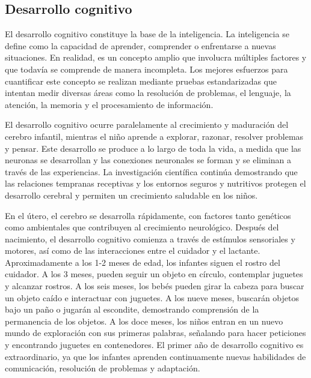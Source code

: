 \documentclass[11pt,letterpaper]{report}
\begin{document}
\subsection{Desarrollo cognitivo}
El desarrollo cognitivo constituye la base de la inteligencia. La inteligencia
se define como la capacidad de aprender, comprender o enfrentarse a nuevas
situaciones. En realidad, es un concepto amplio que involucra múltiples
factores y que todavía se comprende de manera incompleta. Los mejores esfuerzos
para cuantificar este concepto se realizan mediante pruebas estandarizadas que
intentan medir diversas áreas como la resolución de problemas, el lenguaje, la
atención, la memoria y el procesamiento de información. \cite{Wilks2010}

El desarrollo cognitivo ocurre paralelamente al crecimiento y maduración del
cerebro infantil, mientras el niño aprende a explorar, razonar, resolver
problemas y pensar. Este desarrollo se produce a lo largo de toda la vida, a
medida que las neuronas se desarrollan y las conexiones neuronales se forman y
se eliminan a través de las experiencias. La investigación científica continúa
demostrando que las relaciones tempranas receptivas y los entornos seguros y
nutritivos protegen el desarrollo cerebral y permiten un crecimiento saludable
en los niños. \cite{Crotty2023}

En el útero, el cerebro se desarrolla rápidamente, con factores tanto genéticos
como ambientales que contribuyen al crecimiento neurológico. Después del
nacimiento, el desarrollo cognitivo comienza a través de estímulos sensoriales
y motores, así como de las interacciones entre el cuidador y el lactante.
Aproximadamente a los 1-2 meses de edad, los infantes siguen el rostro del
cuidador. A los 3 meses, pueden seguir un objeto en círculo, contemplar
juguetes y alcanzar rostros. A los seis meses, los bebés pueden girar la
cabeza para buscar un objeto caído e interactuar con juguetes. A los nueve
meses, buscarán objetos bajo un paño o jugarán al escondite, demostrando
comprensión de la permanencia de los objetos. A los doce meses, los niños
entran en un nuevo mundo de exploración con sus primeras palabras, señalando
para hacer peticiones y encontrando juguetes en contenedores. El primer año de
desarrollo cognitivo es extraordinario, ya que los infantes aprenden
continuamente nuevas habilidades de comunicación, resolución de problemas y
adaptación. \cite{Crotty2023}
\end{document}
